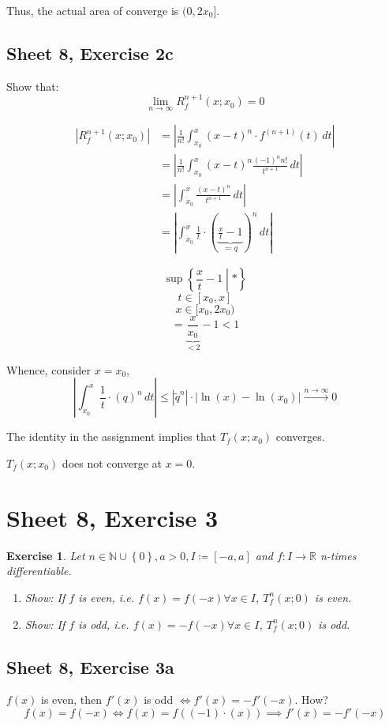 \documentclass{article}
\newtheorem{ex}{Exercise} %
\newcommand{\set}[1]{\left\{#1\right\}}
\newcommand{\card}[1]{\left|#1\right|}
\begin{document}
Thus, the actual area of converge is $(0, 2x_0]$.

\subsection{Sheet 8, Exercise 2c}
Show that:
\[ \lim_{n\to\infty} R_f^{n+1}(x; x_0) = 0 \]

\begin{align*}
  \card{R_f^{n+1}(x; x_0)}
    &= \card{\frac{1}{n!} \int_{x_0}^x (x - t)^n \cdot f^{(n+1)}(t) \, dt} \\
    &= \card{\frac{1}{n!} \int_{x_0}^x (x - t)^n \frac{(-1)^n n!}{t^{n+1}} \, dt} \\
    &= \card{\int_{x_0}^x \frac{(x - t)^n}{t^{n+1}} \, dt} \\
    &= \card{\int_{x_0}^x \frac{1}{t} \cdot \left(\underbrace{\frac{x}{t} - 1}_{\eqqcolon q}\right)^n \, dt}
\end{align*}

\[ \sup\set{\frac{x}{t} - 1 \middle| *} \]
\[ t \in [x_0, x] \]
\[ x \in [x_0, 2x_0) \]
\[ = \underbrace{\frac{x}{x_0}}_{<2} - 1 < 1 \]

Whence, consider $x = x_0$,
\[ \card{\int_{x_0}^x \frac{1}{t} \cdot \left(q\right)^n \, dt} \leq \card{\tilde q^n} \cdot {\card{\ln(x) - \ln(x_0)}} \xrightarrow{n \to \infty} 0 \]

The identity in the assignment implies that $T_f(x; x_0)$ converges.

$T_f(x; x_0)$ does not converge at $x = 0$.

\section{Sheet 8, Exercise 3}
\begin{ex}
  Let $n \in \mathbb N \cup \set{0}, a > 0, I \coloneqq [-a, a]$ and $f: I \to \mathbb R$ n-times differentiable.
  \begin{enumerate}
    \item Show: If $f$ is even, i.e. $f(x) = f(-x) \forall x \in I$, $T_f^n(x; 0)$ is even.
    \item Show: If $f$ is odd, i.e. $f(x) = -f(-x) \forall x \in I$, $T_f^n(x; 0)$ is odd.
  \end{enumerate}
\end{ex}

\subsection{Sheet 8, Exercise 3a}
$f(x)$ is even, then $f'(x)$ is odd $\iff f'(x) = -f'(-x)$. How?
\[ f(x) = f(-x) \iff f(x) = f((-1) \cdot (x)) \implies f'(x) = -f'(-x) \]
\end{document}
